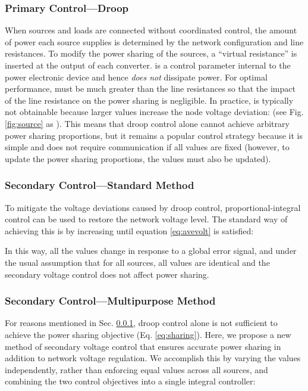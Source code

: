 \documentclass[letterpaper, 10 pt, conference]{ieeeconf}
\begin{document}
\subsubsection{Primary Control---Droop}\label{sec:droop}

When sources and loads are connected without coordinated control, the amount of power each source supplies is determined by the network configuration and line resistances. To modify the power sharing of the sources, a ``virtual resistance''  is inserted at the output of each converter.  is a control parameter internal to the power electronic device and hence \textit{does not} dissipate power. For optimal performance,  must be much greater than the line resistances so that the impact of the line resistance on the power sharing is negligible. In practice,  is typically not obtainable because larger  values increase the node voltage deviation:  (see Fig. \ref{fig:source} as ). This means that droop control alone cannot achieve arbitrary power sharing proportions, but it remains a popular control strategy because it is simple and does not require communication if all  values are fixed (however, to update the power sharing proportions, the  values must also be updated).

\subsubsection{Secondary Control---Standard Method}

To mitigate the voltage deviations caused by droop control, proportional-integral control can be used to restore the network voltage level. The standard way of achieving this is by increasing  until equation \eqref{eq:avevolt} is satisfied:



In this way, all the  values change in response to a global error signal, and under the usual assumption that  for all sources, all  values are identical and the secondary voltage control does not affect power sharing.

\subsubsection{Secondary Control---Multipurpose Method}

For reasons mentioned in Sec. \ref{sec:droop}, droop control alone is not sufficient to achieve the power sharing objective (Eq. \eqref{eq:sharing}). Here, we propose a new method of secondary voltage control that ensures accurate power sharing in addition to network voltage regulation. We accomplish this by varying the  values independently, rather than enforcing equal  values across all sources, and combining the two control objectives into a single integral controller:
\end{document}
